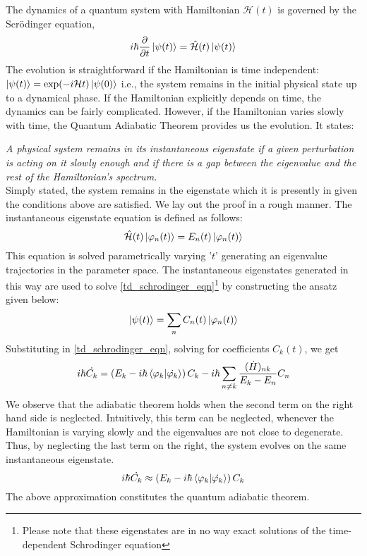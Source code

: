 The dynamics of a quantum system with Hamiltonian $\mathcal{H}(t)$ is governed by the Scr{\"o}dinger equation,
    \begin{equation}\label{td_schrodinger_eqn}
        i\hbar\frac{\partial}{\partial t}\ket{\psi(t)} = \mathcal{\hat{H}}(t)\ket{\psi(t)}
    \end{equation}
The evolution is straightforward if the Hamiltonian is time independent: 
$\ket{\psi(t)} = \text{exp}(-i\mathcal{H}t)\ket{\psi(0)}$ i.e., the system remains in the initial physical state up to a dynamical phase. If the Hamiltonian explicitly depends on time, the dynamics can be fairly complicated. However, if the Hamiltonian varies slowly with time, the Quantum Adiabatic Theorem provides us the evolution.\cite{griffiths_schroeter_2018} It states: \par \vspace{0.4cm} \textit{A physical system remains in its instantaneous eigenstate if a given perturbation is acting on it slowly enough and if there is a gap between the eigenvalue and the rest of the Hamiltonian's spectrum.} \vspace{0.4cm} \\ 
Simply stated, the system remains in the eigenstate which it is presently in given the conditions above are satisfied. We lay out the proof in a rough manner. The instantaneous eigenstate equation is defined as follows:
    \begin{equation}
        \mathcal{\hat{H}}(t)\ket{\varphi_n(t)} = E_n(t)\ket{\varphi_n(t)}
    \end{equation}
This equation is solved parametrically varying '$t$' generating an eigenvalue trajectories in the parameter space. The instantaneous eigenstates generated in this way are used to solve \eqref{td_schrodinger_eqn}\footnote{Please note that these eigenstates are in no way exact solutions of the time-dependent Schrodinger equation} by constructing the ansatz given below:
    \begin{equation}
        \ket{\psi(t)} = \sum_n C_n(t) \ket{\varphi_n(t)}
    \end{equation}
Substituting in \eqref{td_schrodinger_eqn}, solving for coefficients $C_k(t)$, we get
    \begin{equation}
         i\hbar\Dot{C_k} = \left(E_k -i\hbar\bra{\varphi_k}\ket{\Dot{\varphi _k}}\right)C_k -i\hbar\sum_{n\neq k}\frac{(\Dot{H})_{nk}}{E_k-E_n}C_n
    \end{equation}
We observe that the adiabatic theorem holds when the second term on the right hand side is neglected. Intuitively, this term can be neglected, whenever the Hamiltonian is varying slowly and the eigenvalues are not close to degenerate. Thus, by neglecting the last term on the right, the system evolves on the same instantaneous eigenstate. 
    \begin{equation}
         i\hbar\Dot{C_k} \approx \left(E_k -i\hbar\bra{\varphi_k}\ket{\Dot{\varphi _k}}\right)C_k
    \end{equation}
The above approximation constitutes the quantum adiabatic theorem. 
